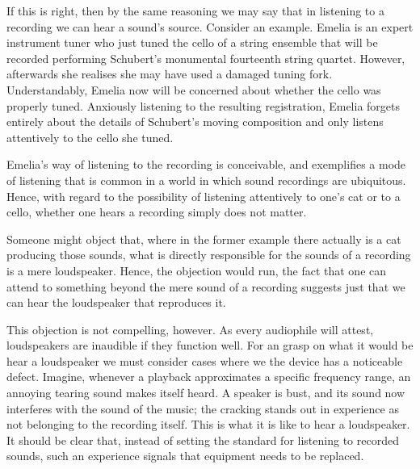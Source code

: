 \documentclass[sloppy, journal, git, bytitle, dodraft]{humapap}
\begin{document}
If this is right, then by the same reasoning we may say that in listening to a recording we can hear a sound's source. Consider an example. Emelia is an expert instrument tuner who just tuned the cello of a string ensemble that will be recorded performing Schubert's monumental fourteenth string quartet. However, afterwards she realises she may have used a damaged tuning fork. Understandably, Emelia now will be concerned about whether the cello was properly tuned. Anxiously listening to the resulting registration, Emelia forgets entirely about the details of Schubert's moving composition and only listens attentively to the cello she tuned. 

Emelia's way of listening to the recording is conceivable, and exemplifies a mode of listening that is common in a world in which sound recordings are ubiquitous. Hence, with regard to the possibility of listening attentively to one's cat or to a cello, whether one hears a recording simply does not matter.

Someone might object that, where in the former example there actually is a cat producing those sounds, what is directly responsible for the sounds of a recording is a mere loudspeaker. Hence, the objection would run, the fact that one can attend to something beyond the mere sound of a recording suggests just that we can hear the loudspeaker that reproduces it. 

This objection is not compelling, however. As every audiophile will attest, loudspeakers are inaudible if they function well. For an grasp on what it would be hear a loudspeaker we must consider cases where we the device has a noticeable defect. Imagine, whenever a playback approximates a specific frequency range, an annoying tearing sound makes itself heard. A speaker is bust, and its sound now interferes with the sound of the music; the cracking stands out in experience as not belonging to the recording itself. This is what it is like to hear a loudspeaker. It should be clear that, instead of setting the standard for listening to recorded sounds, such an experience signals that equipment needs to be replaced. 


\end{document}
